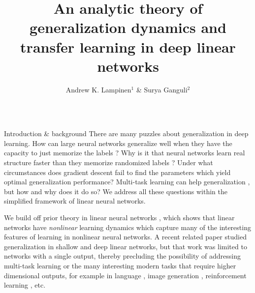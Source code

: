 \documentclass[final]{beamer}
\title{An analytic theory of generalization dynamics and transfer learning in deep linear networks}
\author{Andrew K. Lampinen$^1$ \& Surya Ganguli$^2$}
\institute{$^1$Department of Psychology, Stanford University, $^2$Department of Applied Physics, Stanford University}
\begin{document}

\begin{frame}[t]{}
\begin{columns}

\begin{column}{0.25\textwidth}
\begin{block}{\large Introduction \& background}
There are many puzzles about generalization in deep learning. How can large neural networks generalize well when they have the capacity to just memorize the labels \citep{Zhang2016}? Why is it that neural networks learn real structure faster than they memorize randomized labels \citep{Arpit2017}? Under what circumstances does gradient descent fail to find the parameters which yield optimal generalization performance? Multi-task learning can help generalization \citep[e.g.]{Dong2015, Luong2016}, but how and why does it do so? We address all these questions within the simplified framework of linear neural networks.\par 
We build off prior theory in linear neural networks \citep{Saxe2013,Saxe2013a}, which shows that linear networks have \emph{nonlinear} learning dynamics which capture many of the interesting features of learning in nonlinear neural networks. A recent related paper \citep{Advani2017} studied generalization in shallow and deep linear networks, but that work was limited to networks with a single output, thereby precluding the possibility of addressing multi-task learning or the many interesting modern tasks that require higher dimensional outputs, for example in language \cite{Dong2015}, image generation \cite{Goodfellow2014}, reinforcement learning \cite{Mnih2015, Silver2016}, etc. 
\end{block}
%

\end{column}
\end{columns}
\end{frame}
\end{document}
